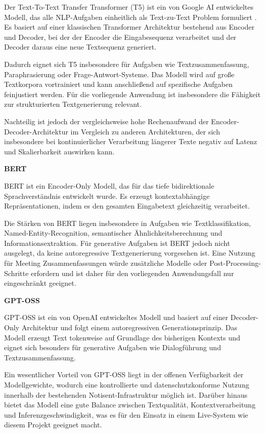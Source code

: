 Der Text-To-Text Transfer Transformer (T5) ist ein von Google AI entwickeltes Modell, das alle NLP-Aufgaben einheitlich als Text-zu-Text Problem formuliert \cite{Raffel2019}. Es basiert auf einer klassischen Transformer Architektur bestehend aus Encoder und Decoder, bei der der Encoder die Eingabesequenz verarbeitet und der Decoder daraus eine neue Textsequenz generiert. 

Dadurch eignet sich T5 insbesondere für Aufgaben wie Textzusammenfassung, Paraphrasierung oder Frage-Antwort-Systeme. Das Modell wird auf große Textkorpora vortrainiert und kann anschließend auf spezifische Aufgaben feinjustiert werden. Für die vorliegende Anwendung ist insbesondere die Fähigkeit zur strukturierten Textgenerierung relevant. 

Nachteilig ist jedoch der vergleichsweise hohe Rechenaufwand der Encoder-Decoder-Architektur im Vergleich zu anderen Architekturen, der sich insbesondere bei kontinuierlicher Verarbeitung längerer Texte negativ auf Latenz und Skalierbarkeit auswirken kann.

\textbf{BERT} 

BERT ist ein Encoder-Only Modell, das für das tiefe bidirektionale Sprachverständnis entwickelt wurde. \cite{Devlin2018} Es erzeugt kontextabhängige Repräsentationen, indem es den gesamten Eingabetext gleichzeitig verarbeitet. 

Die Stärken von BERT liegen insbesondere in Aufgaben wie Textklassifikation, Named-Entity-Recognition, semantischer Ähnlichkeitsberechnung und Informationsextraktion. Für generative Aufgaben ist BERT jedoch nicht ausgelegt, da keine autoregressive Textgenerierung vorgesehen ist. Eine Nutzung für Meeting Zusammenfassungen würde zusätzliche Modelle oder Post-Processing-Schritte erfordern und ist daher für den vorliegenden Anwendungsfall nur eingeschränkt geeignet. 

\textbf{GPT-OSS}

GPT-OSS ist ein von OpenAI entwickeltes Modell und basiert auf einer Decoder-Only Architektur und folgt einem autoregressiven Generationsprinzip. Das Modell erzeugt Text tokenweise auf Grundlage des bisherigen Kontexts und eignet sich besonders für generative Aufgaben wie Dialogführung und Textzusammenfassung. 

Ein wesentlicher Vorteil von GPT-OSS liegt in der offenen Verfügbarkeit der Modellgewichte, wodurch eine kontrollierte und datenschutzkonforme Nutzung innerhalb der bestehenden Notisent-Infrastruktur möglich ist. Darüber hinaus bietet das Modell eine gute Balance zwischen Textqualität, Kontextverarbeitung und Inferenzgeschwindigkeit, was es für den Einsatz in einem Live-System wie diesem Projekt geeignet macht.

